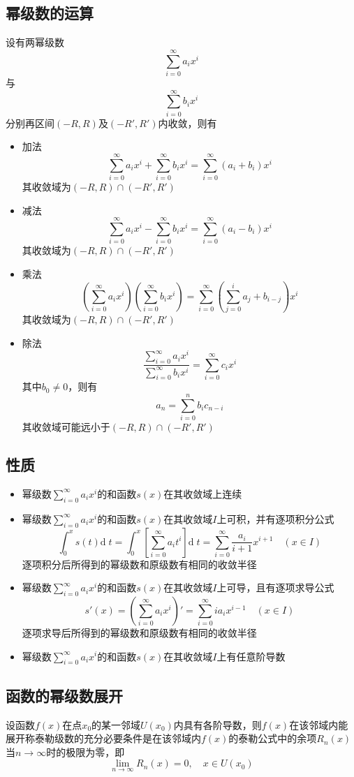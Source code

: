 \documentclass[UTF8]{ctexart}
\newcommand{\dif}[1]{{\mathrm{d}\;\!#1}}
\begin{document}
\subsection*{幂级数的运算}
设有两幂级数
\[\sum_{i=0}^\infty a_ix^i\]
与
\[\sum_{i=0}^\infty b_ix^i\]
分别再区间$(-R,R)$及$(-R',R')$内收敛，则有

\begin{itemize}
  \item 加法
  \[\sum_{i=0}^\infty a_ix^i+\sum_{i=0}^\infty b_ix^i=\sum_{i=0}^\infty (a_i+b_i)x^i\]
  其收敛域为$(-R,R)\cap(-R',R')$
  \item 减法
  \[\sum_{i=0}^\infty a_ix^i-\sum_{i=0}^\infty b_ix^i=\sum_{i=0}^\infty (a_i-b_i)x^i\]
  其收敛域为$(-R,R)\cap(-R',R')$
  \item 乘法
  \[\left(\sum_{i=0}^\infty a_ix^i\right)\left(\sum_{i=0}^\infty b_ix^i\right)=\sum_{i=0}^\infty\left(\sum_{j=0}^i a_j+b_{i-j}\right)x^i\]
  其收敛域为$(-R,R)\cap(-R',R')$
  \item 除法
  \[\frac{\sum_{i=0}^\infty a_ix^i}{\sum_{i=0}^\infty b_ix^i}=\sum_{i=0}^\infty c_ix^i\]
  其中$b_0\ne0$，则有
  \[a_n=\sum_{i=0}^nb_ic_{n-i}\]
  其收敛域可能远小于$(-R,R)\cap(-R',R')$
\end{itemize}

\subsection*{性质}
\begin{itemize}
  \item 幂级数$\displaystyle\sum_{i=0}^\infty a_ix^i$的和函数$s(x)$在其收敛域上连续
  \item 幂级数$\displaystyle\sum_{i=0}^\infty a_ix^i$的和函数$s(x)$在其收敛域$I$上可积，并有逐项积分公式
  \[\int_0^xs(t)\dif{t}=\int_0^x\left[\sum_{i=0}^\infty a_it^i\right]\dif{t}=\sum_{i=0}^\infty \frac{a_i}{i+1}x^{i+1}\quad(x\in I)\]
  逐项积分后所得到的幂级数和原级数有相同的收敛半径
  \item 幂级数$\displaystyle\sum_{i=0}^\infty a_ix^i$的和函数$s(x)$在其收敛域$I$上可导，且有逐项求导公式
  \[s'(x)=\left(\sum_{i=0}^\infty a_ix^i\right)'=\sum_{i=0}^\infty ia_ix^{i-1}\quad(x\in I)\]
  逐项求导后所得到的幂级数和原级数有相同的收敛半径
  \item 幂级数$\displaystyle\sum_{i=0}^\infty a_ix^i$的和函数$s(x)$在其收敛域$I$上有任意阶导数
\end{itemize}

\subsection*{函数的幂级数展开}
设函数$f(x)$在点$x_0$的某一邻域$U(x_0)$内具有各阶导数，则$f(x)$在该邻域内能展开称泰勒级数的充分必要条件是在该邻域内$f(x)$的泰勒公式中的余项$R_n(x)$
当$n\to\infty$时的极限为零，即
\[ \lim_{n\to\infty}R_n(x)=0,\quad x\in U(x_0) \]
\end{document}
